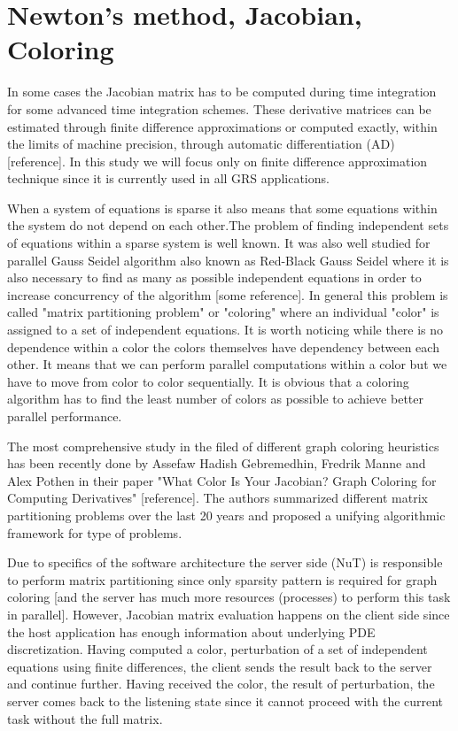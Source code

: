 \section{Newton's method, Jacobian, Coloring}
In some cases the Jacobian matrix has to be computed during time integration for some advanced time integration schemes. These derivative matrices can be estimated through finite
difference approximations or computed exactly, within the limits of machine precision,
through automatic differentiation (AD) [reference]. In this study we will focus only on finite difference approximation technique since it is currently used in all GRS applications.\par 
When a system of equations is sparse it also means that some equations within the system do not depend on each other.The problem of finding independent sets of equations within a sparse system is well known. It was also well studied for parallel Gauss Seidel algorithm also known as Red-Black Gauss Seidel where it is also necessary to find as many as possible independent equations in order to increase concurrency of the algorithm [some reference]. In general this problem is called "matrix partitioning problem" or "coloring" where an individual "color" is assigned to a set of independent equations. It is worth noticing while there is no dependence within a color the colors themselves have dependency between each other. It means that we can perform parallel computations within a color but we have to move from color to color sequentially. It is obvious that a coloring algorithm has to find the least number of colors as possible to achieve better parallel performance.\par

The most comprehensive study in the filed of different graph coloring heuristics has been recently done by Assefaw Hadish Gebremedhin, Fredrik Manne and Alex Pothen in their paper "What Color Is Your Jacobian? Graph Coloring for Computing Derivatives" [reference]. The authors summarized different matrix partitioning problems over the last 20 years and proposed a unifying algorithmic framework for type of problems.\par

Due to specifics of the software architecture the server side (NuT) is responsible to perform matrix partitioning since only sparsity pattern is required for graph coloring [and the server has much more resources (processes) to perform this task in parallel]. However, Jacobian matrix evaluation happens on the client side since the host application has enough information about underlying PDE discretization. Having computed a color, perturbation of a set of independent equations using finite differences, the client sends the result back to the server and continue further. Having received the color, the result of perturbation, the server comes back to the listening state since it cannot proceed with the current task without the full matrix.\par

